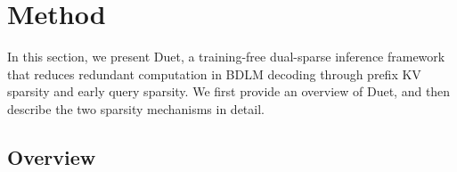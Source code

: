



\section{Method}
\label{sec:method}

In this section, we present Duet, a training-free dual-sparse inference framework that reduces redundant computation in BDLM decoding through prefix KV sparsity and early query sparsity. We first provide an overview of Duet, and then describe the two sparsity mechanisms in detail.

\subsection{Overview}
\label{sec:method_overview}



